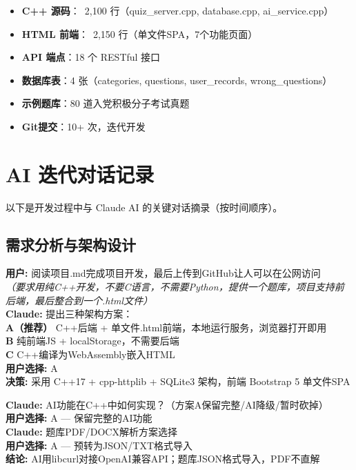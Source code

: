 \documentclass[12pt,a4paper]{ctexart}
\begin{document}
\begin{itemize}[nosep]
    \item \textbf{C++ 源码}：~2,100 行（quiz\_server.cpp, database.cpp, ai\_service.cpp）
    \item \textbf{HTML 前端}：~2,150 行（单文件SPA，7个功能页面）
    \item \textbf{API 端点}：18 个 RESTful 接口
    \item \textbf{数据库表}：4 张（categories, questions, user\_records, wrong\_questions）
    \item \textbf{示例题库}：80 道入党积极分子考试真题
    \item \textbf{Git提交}：10+ 次，迭代开发
\end{itemize}

\newpage

\section{AI 迭代对话记录}

以下是开发过程中与 Claude AI 的关键对话摘录（按时间顺序）。

\subsection{需求分析与架构设计}

\begin{dialogbox}[title=对话1: 确定技术方案]
\textbf{用户:} 阅读项目.md完成项目开发，最后上传到GitHub让人可以在公网访问\\
\textit{（要求用纯C++开发，不要C语言，不需要Python，提供一个题库，项目支持前后端，最后整合到一个.html文件）}\\[4pt]
\textbf{Claude:} 提出三种架构方案：\\
\textbf{A（推荐）} C++后端 + 单文件.html前端，本地运行服务，浏览器打开即用\\
\textbf{B} 纯前端JS + localStorage，不需要后端\\
\textbf{C} C++编译为WebAssembly嵌入HTML\\[4pt]
\textbf{用户选择:} A\\[4pt]
\textbf{决策:} 采用 C++17 + cpp-httplib + SQLite3 架构，前端 Bootstrap 5 单文件SPA
\end{dialogbox}

\vspace{6pt}

\begin{dialogbox}[title=对话2: 需求细化]
\textbf{Claude:} AI功能在C++中如何实现？（方案A保留完整/AI降级/暂时砍掉）\\
\textbf{用户选择:} A — 保留完整的AI功能\\[4pt]
\textbf{Claude:} 题库PDF/DOCX解析方案选择\\
\textbf{用户选择:} A — 预转为JSON/TXT格式导入\\[4pt]
\textbf{结论:} AI用libcurl对接OpenAI兼容API；题库JSON格式导入，PDF不直解
\end{dialogbox}
\end{document}
